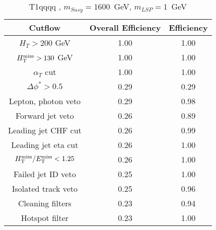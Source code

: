\begin{longtable}{| c | c | c  | }
\caption{T1qqqq , $m_{Susy} = 1600 $~GeV, $m_{LSP} = 1$~GeV} \label{tab: T1qqqq  1600  1 } \\    \hline 
\textbf{Cutflow} & \textbf{Overall Efficiency} & \textbf{Efficiency}\\ \hline 
$H_{T} > 200$ GeV & 1.00 & 1.00\\ \hline 
$H_{\rm T}^{\rm miss} > 130$ GeV & 1.00 & 1.00\\ \hline 
$\alpha_{T}$ cut & 1.00 & 1.00\\ \hline 
$\Delta\phi^{*} > 0.5$ & 0.29 & 0.29\\ \hline 
Lepton, photon veto & 0.29 & 0.98\\ \hline 
Forward jet veto & 0.26 & 0.89\\ \hline 
Leading jet CHF cut & 0.26 & 0.99\\ \hline 
Leading jet eta cut & 0.26 & 1.00\\ \hline 
$H_{\rm T}^{\rm miss} / E_{\rm T}^{\rm miss} < 1.25$ & 0.26 & 1.00\\ \hline 
Failed jet ID veto & 0.25 & 1.00\\ \hline 
Isolated track veto & 0.25 & 0.96\\ \hline 
Cleaning filters & 0.23 & 0.94\\ \hline 
Hotspot filter & 0.23 & 1.00\\ \hline 
    \hline 
    \hline 
\end{longtable}
